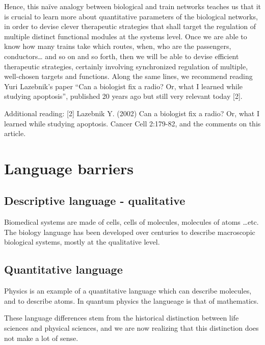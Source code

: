 \documentclass[
]{book}
\begin{document}
Hence, this naïve analogy between biological and train networks teaches us that it is crucial to learn more about quantitative parameters of the biological networks, in order to devise clever therapeutic strategies that shall target the regulation of multiple distinct functional modules at the systems level. Once we are able to know how many trains take which routes, when, who are the passengers, conductors\ldots{} and so on and so forth, then we will be able to devise efficient therapeutic strategies, certainly involving synchronized regulation of multiple, well-chosen targets and functions. Along the same lines, we recommend reading Yuri Lazebnik's paper ``Can a biologist fix a radio? Or, what I learned while studying apoptosis'', published 20 years ago but still very relevant today {[}2{]}.

Additional reading:
{[}2{]} Lazebnik Y. (2002) Can a biologist fix a radio? Or, what I learned while studying apoptosis. Cancer Cell 2:179-82, and the comments on this article.

\hypertarget{language-barriers}{%
\chapter{Language barriers}\label{language-barriers}}

\hypertarget{descriptive-language---qualitative}{%
\section{Descriptive language - qualitative}\label{descriptive-language---qualitative}}

Biomedical systems are made of cells, cells of molecules, molecules of atoms \ldots etc. The biology language has been developed over centuries to describe macroscopic biological systems, mostly at the qualitative level.

\hypertarget{quantitative-language}{%
\section{Quantitative language}\label{quantitative-language}}

Physics is an example of a quantitative language which can describe molecules, and to describe atoms. In quantum physics the langueage is that of mathematics.

These language differences stem from the historical distinction between life sciences and physical sciences, and we are now realizing that this distinction does not make a lot of sense.
\end{document}
